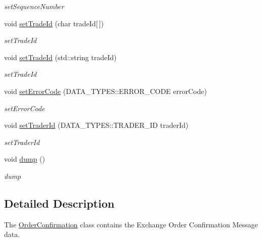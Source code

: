 \begin{DoxyCompactItemize}
\begin{DoxyCompactList}\small\item\em set\-Sequence\-Number \end{DoxyCompactList}\item 
void \hyperlink{class_a_p_i2_1_1_order_confirmation_a562db0db2564d8a18e3ae6f4a7d5f409}{set\-Trade\-Id} (char trade\-Id\mbox{[}$\,$\mbox{]})
\begin{DoxyCompactList}\small\item\em set\-Trade\-Id \end{DoxyCompactList}\item 
void \hyperlink{class_a_p_i2_1_1_order_confirmation_ad9348d10f63cce30b7804daaba9b515d}{set\-Trade\-Id} (std\-::string trade\-Id)
\begin{DoxyCompactList}\small\item\em set\-Trade\-Id \end{DoxyCompactList}\item 
void \hyperlink{class_a_p_i2_1_1_order_confirmation_a42a225988e7b4107812ffc7a23ad541f}{set\-Error\-Code} (D\-A\-T\-A\-\_\-\-T\-Y\-P\-E\-S\-::\-E\-R\-R\-O\-R\-\_\-\-C\-O\-D\-E error\-Code)
\begin{DoxyCompactList}\small\item\em set\-Error\-Code \end{DoxyCompactList}\item 
void \hyperlink{class_a_p_i2_1_1_order_confirmation_af8c85eec5585dc344b9654c2c5f7935f}{set\-Trader\-Id} (D\-A\-T\-A\-\_\-\-T\-Y\-P\-E\-S\-::\-T\-R\-A\-D\-E\-R\-\_\-\-I\-D trader\-Id)
\begin{DoxyCompactList}\small\item\em set\-Trader\-Id \end{DoxyCompactList}\item 
\hypertarget{class_a_p_i2_1_1_order_confirmation_a02ece472ddc1d59ca477db219838866a}{void \hyperlink{class_a_p_i2_1_1_order_confirmation_a02ece472ddc1d59ca477db219838866a}{dump} ()}\label{class_a_p_i2_1_1_order_confirmation_a02ece472ddc1d59ca477db219838866a}

\begin{DoxyCompactList}\small\item\em dump \end{DoxyCompactList}\end{DoxyCompactItemize}


\subsection{Detailed Description}
The \hyperlink{class_a_p_i2_1_1_order_confirmation}{Order\-Confirmation} class contains the Exchange Order Confirmation Message data. 

